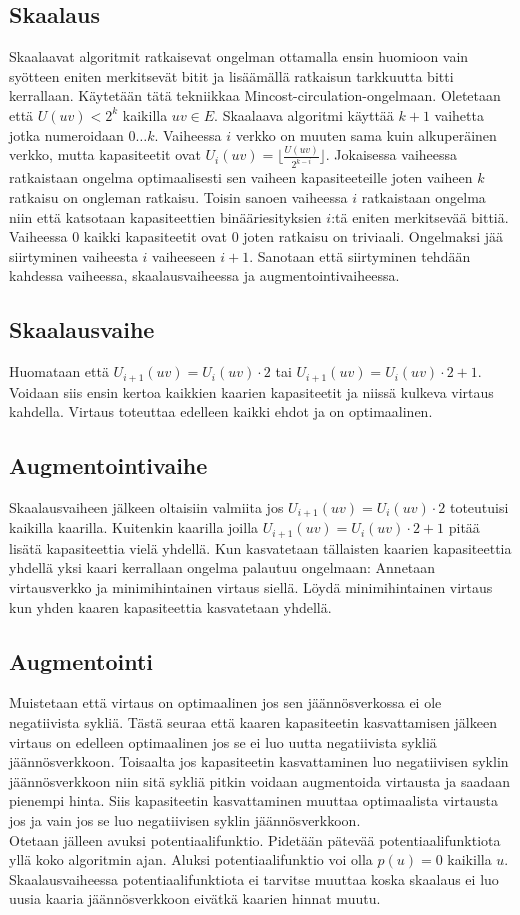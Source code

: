 \documentclass[a4paper, 11pt]{article}
\begin{document}
\subsection*{Skaalaus}
Skaalaavat algoritmit ratkaisevat ongelman ottamalla ensin huomioon vain syötteen
eniten merkitsevät bitit ja lisäämällä ratkaisun tarkkuutta bitti kerrallaan. Käytetään
tätä tekniikkaa Mincost-circulation-ongelmaan. Oletetaan että $U(uv) < 2^k$ kaikilla $uv \in E$.
Skaalaava algoritmi käyttää $k+1$ vaihetta jotka numeroidaan $0 \ldots k$. Vaiheessa 
$i$ verkko on muuten sama kuin 
alkuperäinen verkko, mutta kapasiteetit ovat $U_i(uv) = \lfloor \frac{U(uv)}{2^{k-i}} \rfloor$.
Jokaisessa vaiheessa ratkaistaan ongelma optimaalisesti sen vaiheen kapasiteeteille joten vaiheen
$k$ ratkaisu on ongleman ratkaisu.
Toisin sanoen vaiheessa $i$ ratkaistaan ongelma niin että katsotaan kapasiteettien
binääriesityksien $i$:tä eniten merkitsevää bittiä. Vaiheessa $0$ kaikki kapasiteetit ovat $0$ joten
ratkaisu on triviaali. Ongelmaksi jää siirtyminen vaiheesta $i$ vaiheeseen $i+1$. Sanotaan
että siirtyminen tehdään kahdessa vaiheessa, skaalausvaiheessa ja augmentointivaiheessa.
\subsection*{Skaalausvaihe}
Huomataan että $U_{i+1}(uv) = U_i(uv) \cdot 2$ tai $U_{i+1}(uv) = U_i(uv) \cdot 2+1$. Voidaan siis ensin kertoa
kaikkien kaarien kapasiteetit ja niissä kulkeva virtaus kahdella. Virtaus toteuttaa edelleen
kaikki ehdot ja on optimaalinen.
\subsection*{Augmentointivaihe}
Skaalausvaiheen jälkeen oltaisiin valmiita jos $U_{i+1}(uv) = U_i(uv) \cdot 2$ toteutuisi kaikilla
kaarilla. Kuitenkin kaarilla joilla $U_{i+1}(uv) = U_i(uv) \cdot 2+1$ pitää lisätä kapasiteettia 
vielä yhdellä.
Kun kasvatetaan tällaisten kaarien kapasiteettia yhdellä yksi kaari kerrallaan 
ongelma palautuu ongelmaan:
Annetaan virtausverkko ja minimihintainen virtaus siellä. Löydä minimihintainen virtaus kun yhden kaaren 
kapasiteettia kasvatetaan yhdellä.
\subsection*{Augmentointi}
Muistetaan että virtaus on optimaalinen jos sen jäännösverkossa ei ole negatiivista
sykliä. Tästä seuraa että kaaren kapasiteetin kasvattamisen jälkeen virtaus on edelleen optimaalinen
jos se ei luo uutta negatiivista sykliä jäännösverkkoon. Toisaalta jos kapasiteetin
kasvattaminen luo negatiivisen syklin jäännösverkkoon niin sitä sykliä pitkin voidaan
augmentoida virtausta ja saadaan pienempi hinta. Siis kapasiteetin kasvattaminen 
muuttaa optimaalista virtausta
jos ja vain jos se luo negatiivisen syklin jäännösverkkoon. \\
\noindent
Otetaan jälleen avuksi potentiaalifunktio. Pidetään pätevää potentiaalifunktiota 
yllä koko algoritmin ajan. Aluksi potentiaalifunktio voi olla $p(u) = 0$ kaikilla $u$.
Skaalausvaiheessa potentiaalifunktiota ei tarvitse muuttaa koska skaalaus ei luo
uusia kaaria jäännösverkkoon eivätkä kaarien hinnat muutu.
\end{document}

